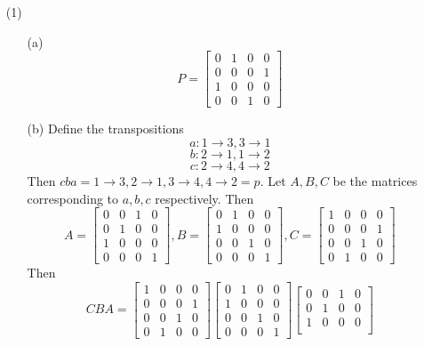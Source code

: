 \begin{itemize}
\item[(1)]
\begin{itemize}
\item[(a)]
$$P = \begin{bmatrix}
0 & 1 & 0 & 0 \\
0 & 0 & 0 & 1 \\
1 & 0 & 0 & 0 \\
0 & 0 & 1 & 0
\end{bmatrix}$$
\item[(b)]
Define the transpositions 
$$a: 1 \rightarrow 3, 3 \rightarrow 1$$
$$b: 2 \rightarrow 1, 1 \rightarrow 2$$
$$c: 2 \rightarrow 4, 4 \rightarrow 2$$
Then $cba = 1 \rightarrow 3, 2 \rightarrow 1, 3 \rightarrow 4, 4 \rightarrow 2 = p$. Let $A, B, C$ be the matrices corresponding to $a, b, c$ respectively. Then
$$A = \begin{bmatrix}
0 & 0 & 1 & 0 \\
0 & 1 & 0 & 0 \\
1 & 0 & 0 & 0 \\
0 & 0 & 0 & 1
\end{bmatrix}, B = \begin{bmatrix}
0 & 1 & 0 & 0 \\
1 & 0 & 0 & 0 \\
0 & 0 & 1 & 0 \\
0 & 0 & 0 & 1
\end{bmatrix}, C = \begin{bmatrix}
1 & 0 & 0 & 0 \\
0 & 0 & 0 & 1 \\
0 & 0 & 1 & 0 \\
0 & 1 & 0 & 0
\end{bmatrix}$$
Then
$$CBA = \begin{bmatrix}
1 & 0 & 0 & 0 \\
0 & 0 & 0 & 1 \\
0 & 0 & 1 & 0 \\
0 & 1 & 0 & 0
\end{bmatrix}\begin{bmatrix}
0 & 1 & 0 & 0 \\
1 & 0 & 0 & 0 \\
0 & 0 & 1 & 0 \\
0 & 0 & 0 & 1
\end{bmatrix}\begin{bmatrix}
0 & 0 & 1 & 0 \\
0 & 1 & 0 & 0 \\
1 & 0 & 0 & 0 \\

\end{bmatrix}$$
\end{itemize}
\end{itemize}
